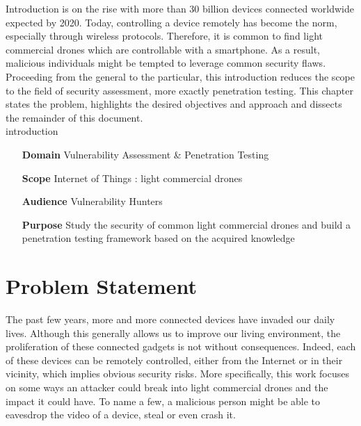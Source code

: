 \begin{chaptercover}{Introduction}%
{
{\large \hyphenation{}  is on the rise with more than 30 billion devices connected worldwide expected by 2020. Today, controlling a device remotely has become the norm, especially through wireless protocols. Therefore, it is common to find light commercial drones which are controllable with a smartphone. As a result, malicious individuals might be tempted to leverage common security flaws. \newline \\ Proceeding from the general to the particular, this introduction reduces the scope to the field of security assessment, more exactly penetration testing. This chapter states the problem, highlights the desired objectives and approach and dissects the remainder of this document.\newline\\}}%
{introduction}

\begin{projectdata}
\begin{itemize}[labelsep=1cm]
  \item [\textbf{Domain}] Vulnerability Assessment \& Penetration Testing
  \item [\textbf{Scope}] Internet of Things : light commercial drones
  \item [\textbf{Audience}] Vulnerability Hunters
  \item [\textbf{Purpose}] Study the security of common light commercial drones and build a penetration testing framework based on the acquired knowledge
\end{itemize}
\end{projectdata}

\section{Problem Statement}
{
The past few years, more and more connected devices have invaded our daily lives. Although this generally allows us to improve our living environment, the proliferation of these connected gadgets is not without consequences. Indeed, each of these devices can be remotely controlled, either from the Internet or in their vicinity, which implies obvious security risks. More specifically, this work focuses on some ways an attacker could break into light commercial drones and the impact it could have. To name a few, a malicious person might be able to eavesdrop the video of a device, steal or even crash it.}


\end{chaptercover}

